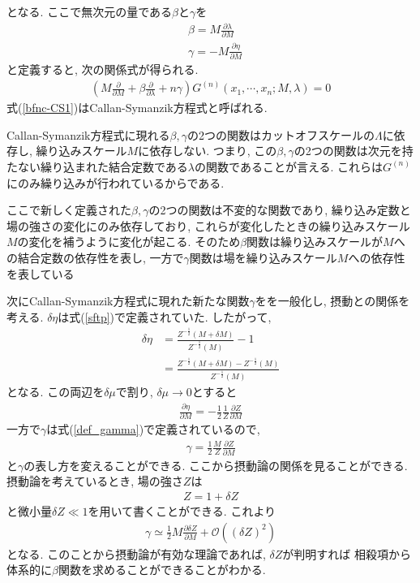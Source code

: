 となる.
ここで無次元の量である$\beta$と$\gamma$を
\begin{align}
  &\beta = M\frac{\partial \lambda}{\partial M}\label{def_beta}\\
  &\gamma = -M\frac{\partial \eta}{\partial M} \label{def_gamma}
\end{align}
と定義すると, 次の関係式が得られる.
\begin{align}
  \left(M \frac{\partial }{\partial M} + \beta \frac{\partial}{\partial \lambda} + n \gamma\right) G^{(n)}(x_1,\cdots,x_n;M,\lambda) = 0 \label{bfnc-CS1}
\end{align}
式(\ref{bfnc-CS1})はCallan-Symanzik方程式と呼ばれる. \cite{callanBrokenScaleInvariance1970,symanzikSmallDistanceBehaviour1970,symanzikSmalldistancebehaviourAnalysisWilson1971}

Callan-Symanzik方程式に現れる$\beta, \gamma$の2つの関数はカットオフスケールの$\Lambda$に依存し, 繰り込みスケール$M$に依存しない.
つまり, この$\beta, \gamma$の2つの関数は次元を持たない繰り込まれた結合定数である$\lambda$の関数であることが言える.
これらは$G^{(n)}$にのみ繰り込みが行われているからである.

ここで新しく定義された$\beta, \gamma$の2つの関数は不変的な関数であり, 繰り込み定数と場の強さの変化にのみ依存しており, これらが変化したときの繰り込みスケール$M$の変化を補うように変化が起こる. 
そのため$\beta$関数は繰り込みスケールが$M$への結合定数の依存性を表し, 一方で$\gamma$関数は場を繰り込みスケール$M$への依存性を表している

次にCallan-Symanzik方程式に現れた新たな関数$\gamma$をを一般化し, 摂動との関係を考える.
$\delta \eta$は式(\ref{sftp})で定義されていた.
したがって,
\begin{align}
  \delta \eta &= \frac{Z^{-\frac{1}{2}}(M+\delta M)}{Z^{-\frac{1}{2}}(M)}-1\nonumber\\
              &= \frac{Z^{-\frac{1}{2}}(M+\delta M)-Z^{-\frac{1}{2}}(M)}{Z^{-\frac{1}{2}}(M)}
\end{align}
となる.
この両辺を$\delta \mu$で割り, $\delta \mu\rightarrow0$とすると
\begin{align}
  \frac{\partial \eta}{\partial M} = -\frac{1}{2}\frac{1}{Z}\frac{\partial Z}{\partial M}
\end{align}
一方で$\gamma$は式(\ref{def_gamma})で定義されているので,
\begin{align}
  \gamma = \frac{1}{2}\frac{M}{Z} \frac{\partial Z}{\partial M}\label{def_gamma_correct}
\end{align}
と$\gamma$の表し方を変えることができる.
ここから摂動論の関係を見ることができる.
摂動論を考えているとき, 場の強さ$Z$は
\begin{align}
  Z = 1 +\delta Z
\end{align}
と微小量$\delta Z \ll 1$を用いて書くことができる.
これより
\begin{align}
  \gamma \simeq \frac{1}{2}M \frac{\partial \delta Z}{\partial M} + \mathcal{O}((\delta Z)^2)
\end{align}
となる.
このことから摂動論が有効な理論であれば, $\delta Z$が判明すれば 相殺項から体系的に$\beta$関数を求めることができることがわかる.

